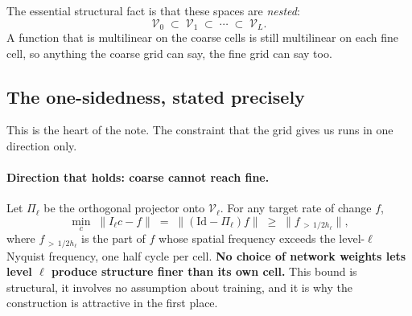 \documentclass[11pt,a4paper]{article}
\newcommand{\Vs}{\mathcal{V}}
\newcommand{\Id}{\mathrm{Id}}
\begin{document}
The essential structural fact is that these spaces are \emph{nested}:
\begin{equation}
\Vs_0 \;\subset\; \Vs_1 \;\subset\; \cdots \;\subset\; \Vs_L .
\label{eq:nested}
\end{equation}
A function that is multilinear on the coarse cells is still multilinear on each fine cell,
so anything the coarse grid can say, the fine grid can say too.

\begin{center}
\end{center}

\subsection{The one-sidedness, stated precisely}
\label{sec:onesided}

This is the heart of the note. The constraint that the grid gives us runs in one direction
only.

\paragraph{Direction that holds: coarse cannot reach fine.} Let $\Pi_\ell$ be the
orthogonal projector onto $\Vs_\ell$. For any target rate of change $f$,
\begin{equation}
\min_{c} \; \big\| I_\ell c - f \big\|
\;=\; \big\| (\Id - \Pi_\ell) f \big\|
\;\geq\; \big\| f_{\,>\,1/2h_\ell} \big\| ,
\label{eq:coarse-cannot}
\end{equation}
where $f_{\,>\,1/2h_\ell}$ is the part of $f$ whose spatial frequency exceeds the
level-$\ell$ Nyquist frequency, one half cycle per cell. \textbf{No choice of network
weights lets level $\ell$ produce structure finer than its own cell.} This bound is
structural, it involves no assumption about training, and it is why the construction is
attractive in the first place.
\end{document}
